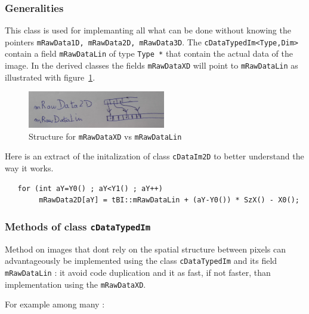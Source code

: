 
\subsubsection{Generalities}

This class is used for  implemanting all what can be done without
knowing the pointers {\tt mRawData1D, mRawData2D, mRawData3D}.
The  {\tt cDataTypedIm<Type,Dim>}  contain a field {\tt mRawDataLin} of
type {\tt Type *}  that contain the actual data of the image.
In the derived classes the fields {\tt mRawDataXD} will point
to {\tt mRawDataLin} as illustrated with figure~\ref{fig:Ptr2D}.



\begin{figure}
\centering
\includegraphics[width=6cm]{Programmer/ImagesProg/PtrIm2D.jpg}
\caption{Structure for {\tt mRawDataXD} vs {\tt mRawDataLin}}
\label{fig:Ptr2D}
\end{figure}

Here is an extract of the initalization of class {\tt cDataIm2D} to better understand
the way it works.


\lstset {language=C++}
\begin{lstlisting}
   for (int aY=Y0() ; aY<Y1() ; aY++)
        mRawData2D[aY] = tBI::mRawDataLin + (aY-Y0()) * SzX() - X0();
\end{lstlisting}



\subsubsection{Methods of class {\tt cDataTypedIm}}

Method  on images that dont rely on the spatial structure between pixels can  advantageously
be implemented using the class {\tt cDataTypedIm} and its field {\tt mRawDataLin} :
it avoid code duplication  and it as fast, if not faster, than implementation using
the {\tt mRawDataXD}. 

For example among many :

